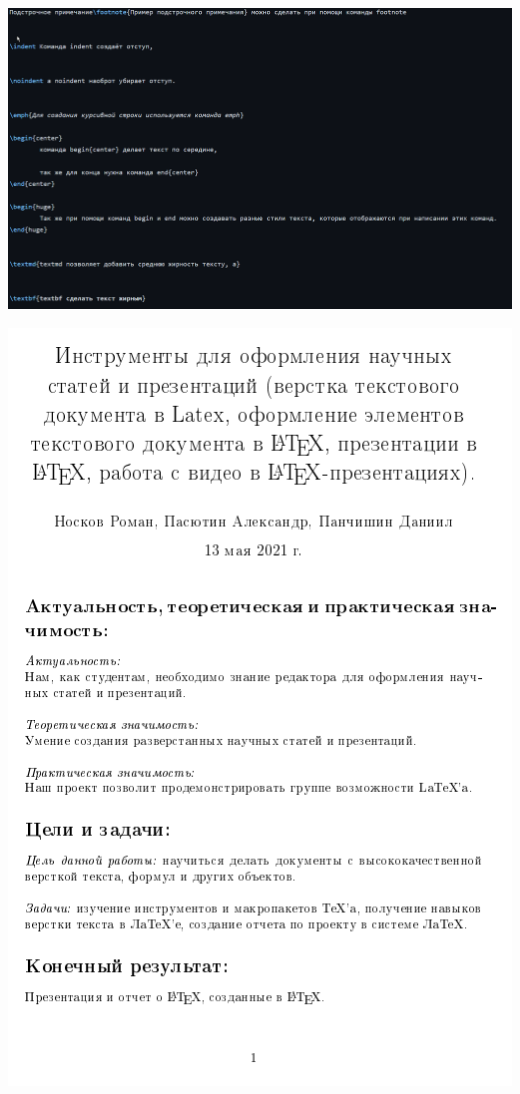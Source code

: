 \documentclass{article}
\begin{document}
	
	\includegraphics[width=\linewidth]{4}
	
	
	\includegraphics[width=\linewidth]{5}
	
\end{document}
